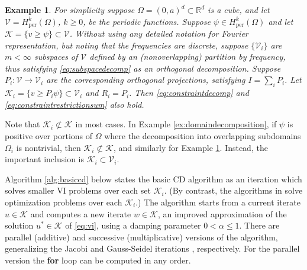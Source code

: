 \documentclass[letterpaper,final,12pt,reqno]{amsart}
\theoremstyle{cstyle}
\theoremstyle{cstyle*}
\theoremstyle{dstyle}
\newtheorem{example}[theorem]{Example}
\numberwithin{equation}{section}
\numberwithin{figure}{section}
\numberwithin{table}{section}
\numberwithin{theorem}{section}
\newcommand{\RR}{\mathbb{R}}
\newcommand{\cK}{\mathcal{K}}
\newcommand{\cV}{\mathcal{V}}
\begin{document}
\begin{example}  \label{ex:frequencydecomposition}  For simplicity suppose $\Omega = (0,a)^d \subset \RR^d$ is a cube, and let $\cV = H_{\text{per}}^k(\Omega)$, $k\ge 0$, be the periodic functions.  Suppose $\psi \in H_{\text{per}}^k(\Omega)$ and let $\cK = \{v \ge \psi\} \subset \cV$.  Without using any detailed notation for Fourier representation, but noting that the frequencies are discrete, suppose $\{\cV_i\}$ are $m<\infty$ subspaces of $\cV$ defined by an (nonoverlapping) partition by frequency, thus satisfying \eqref{eq:subspacedecomp} as an orthogonal decomposition.  Suppose $P_i:\cV \to \cV_i$ are the corresponding orthogonal projections, satisfying $I = \sum_i P_i$.  Let $\cK_i = \{v \ge P_i \psi\} \subset \cV_i$ and $R_i = P_i$.  Then \eqref{eq:constraintdecomp} and \eqref{eq:constraintrestrictionsum} also hold.
\end{example}

Note that $\cK_i \not\subset \cK$ in most cases.  In Example \ref{ex:domaindecomposition}, if $\psi$ is positive over portions of $\Omega$ where the decomposition into overlapping subdomains $\Omega_i$ is nontrivial, then $\cK_i \not\subset \cK$, and similarly for Example \ref{ex:frequencydecomposition}.  Instead, the important inclusion is $\cK_i \subset \cV_i$.

Algorithm \ref{alg:basiccd} below states the basic CD algorithm as an iteration which solves smaller VI problems over each set $\cK_i$.  (By contrast, the algorithms in \cite{Tai2003} solve optimization problems over each $\cK_i$.)  The algorithm starts from a current iterate $u \in \cK$ and computes a new iterate $w\in\cK$, an improved approximation of the solution $u^* \in \cK$ of \eqref{eq:vi}, using a damping parameter $0<\alpha\le 1$.  There are parallel (additive) and successive (multiplicative) versions of the algorithm, generalizing the Jacobi and Gauss-Seidel iterations \cite{Greenbaum1997}, respectively.  For the parallel version the \textbf{for} loop can be computed in any order.
\end{document}
